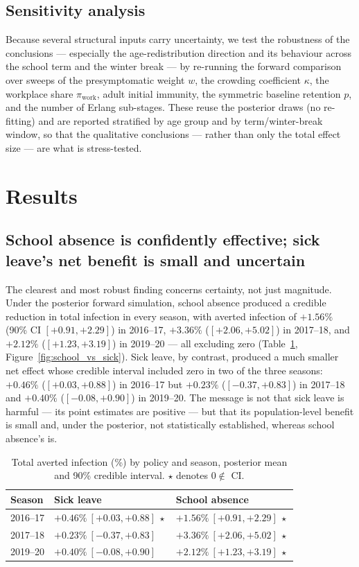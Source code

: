 \documentclass[12pt]{article}
\theoremstyle{plain}
\theoremstyle{remark}
\theoremstyle{definition}
\begin{document}
\subsection{Sensitivity analysis}
\label{sec:sens}
Because several structural inputs carry uncertainty, we test the robustness of the conclusions --- especially the age-redistribution direction and its behaviour across the school term and the winter break --- by re-running the forward comparison over sweeps of the presymptomatic weight $w$, the crowding coefficient $\kappa$, the workplace share $\pi_{\mathrm{work}}$, adult initial immunity, the symmetric baseline retention $p$, and the number of Erlang sub-stages. These reuse the posterior draws (no re-fitting) and are reported stratified by age group and by term/winter-break window, so that the qualitative conclusions --- rather than only the total effect size --- are what is stress-tested.

\section{Results}
\subsection{School absence is confidently effective; sick leave's net benefit is small and uncertain}
The clearest and most robust finding concerns certainty, not just magnitude. Under the posterior forward simulation, school absence produced a credible reduction in total infection in every season, with averted infection of $+1.56\%$ (90\% CI $[+0.91, +2.29]$) in 2016--17, $+3.36\%$ ($[+2.06, +5.02]$) in 2017--18, and $+2.12\%$ ($[+1.23, +3.19]$) in 2019--20 --- all excluding zero (Table~\ref{tab:averted}, Figure~\ref{fig:school_vs_sick}). Sick leave, by contrast, produced a much smaller net effect whose credible interval included zero in two of the three seasons: $+0.46\%$ ($[+0.03, +0.88]$) in 2016--17 but $+0.23\%$ ($[-0.37, +0.83]$) in 2017--18 and $+0.40\%$ ($[-0.08, +0.90]$) in 2019--20. The message is not that sick leave is harmful --- its point estimates are positive --- but that its population-level benefit is small and, under the posterior, not statistically established, whereas school absence's is.

\begin{table}[H]
\centering
\caption{Total averted infection (\%) by policy and season, posterior mean and 90\% credible interval. $\star$ denotes $0 \notin$ CI.}
\label{tab:averted}
\begin{tabular}{@{}lll@{}}
\toprule
Season & Sick leave & School absence \\
\midrule
2016--17 & $+0.46\%\ [+0.03, +0.88]\ \star$ & $+1.56\%\ [+0.91, +2.29]\ \star$ \\
2017--18 & $+0.23\%\ [-0.37, +0.83]$        & $+3.36\%\ [+2.06, +5.02]\ \star$ \\
2019--20 & $+0.40\%\ [-0.08, +0.90]$        & $+2.12\%\ [+1.23, +3.19]\ \star$ \\
\bottomrule
\end{tabular}
\end{table}
\end{document}
